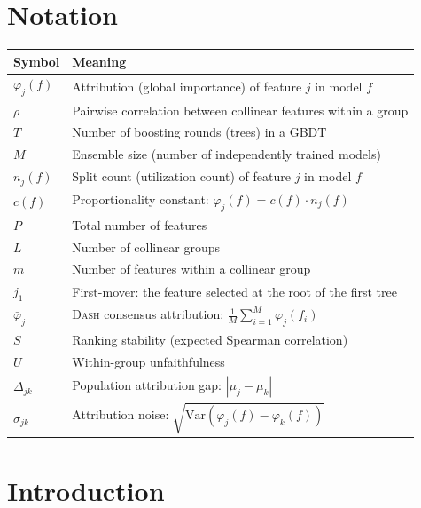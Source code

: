 \documentclass{jmlr}
\newcommand{\Var}{\mathrm{Var}}
\newcommand{\DASH}{\textsc{Dash}}
\begin{document}
\section*{Notation}
\begin{center}
\small
\begin{tabular}{@{}lp{10cm}@{}}
\toprule
\textbf{Symbol} & \textbf{Meaning} \\
\midrule
$\varphi_j(f)$ & Attribution (global importance) of feature $j$ in model $f$ \\
$\rho$ & Pairwise correlation between collinear features within a group \\
$T$ & Number of boosting rounds (trees) in a GBDT \\
$M$ & Ensemble size (number of independently trained models) \\
$n_j(f)$ & Split count (utilization count) of feature $j$ in model $f$ \\
$c(f)$ & Proportionality constant: $\varphi_j(f) = c(f) \cdot n_j(f)$ \\
$P$ & Total number of features \\
$L$ & Number of collinear groups \\
$m$ & Number of features within a collinear group \\
$j_1$ & First-mover: the feature selected at the root of the first tree \\
$\bar\varphi_j$ & \DASH{} consensus attribution: $\frac{1}{M}\sum_{i=1}^M \varphi_j(f_i)$ \\
$S$ & Ranking stability (expected Spearman correlation) \\
$U$ & Within-group unfaithfulness \\
$\Delta_{jk}$ & Population attribution gap: $|\mu_j - \mu_k|$ \\
$\sigma_{jk}$ & Attribution noise: $\sqrt{\Var(\varphi_j(f) - \varphi_k(f))}$ \\
\bottomrule
\end{tabular}
\end{center}


\section{Introduction}
\label{sec:intro}
\end{document}
